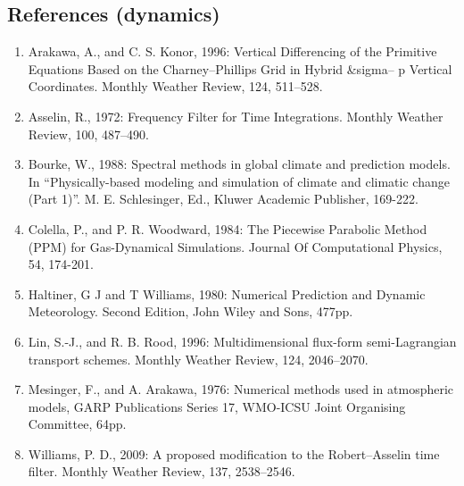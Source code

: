 \hypertarget{references-dynamics}{%
\subsection{References (dynamics)}\label{references-dynamics}}

\begin{enumerate}
\def\labelenumi{\arabic{enumi}.}
\item
  Arakawa, A., and C. S. Konor, 1996: Vertical Differencing of the
  Primitive Equations Based on the Charney--Phillips Grid in Hybrid
  \&sigma-- p Vertical Coordinates. Monthly Weather Review, 124,
  511--528.
\item
  Asselin, R., 1972: Frequency Filter for Time Integrations. Monthly
  Weather Review, 100, 487--490.
\item
  Bourke, W., 1988: Spectral methods in global climate and prediction
  models. In ``Physically-based modeling and simulation of climate and
  climatic change (Part 1)''. M. E. Schlesinger, Ed., Kluwer Academic
  Publisher, 169-222.
\item
  Colella, P., and P. R. Woodward, 1984: The Piecewise Parabolic Method
  (PPM) for Gas-Dynamical Simulations. Journal Of Computational Physics,
  54, 174-201.
\item
  Haltiner, G J and T Williams, 1980: Numerical Prediction and Dynamic
  Meteorology. Second Edition, John Wiley and Sons, 477pp.
\item
  Lin, S.-J., and R. B. Rood, 1996: Multidimensional flux-form
  semi-Lagrangian transport schemes. Monthly Weather Review, 124,
  2046--2070.
\item
  Mesinger, F., and A. Arakawa, 1976: Numerical methods used in
  atmospheric models, GARP Publications Series 17, WMO-ICSU Joint
  Organising Committee, 64pp.
\item
  Williams, P. D., 2009: A proposed modification to the Robert--Asselin
  time filter. Monthly Weather Review, 137, 2538--2546.
\end{enumerate}

